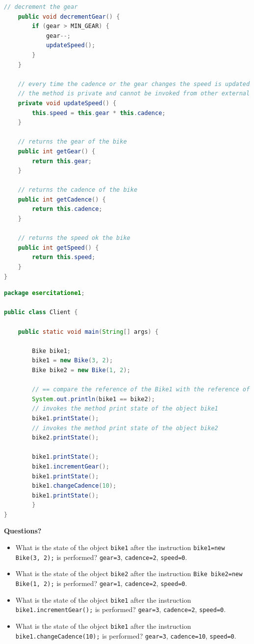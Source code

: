 \documentclass{article}
\theoremstyle{definition}
\begin{document}
\begin{lstlisting}[language=Java,escapechar=|]
	// decrement the gear
	public void decrementGear() {
		if (gear > MIN_GEAR) {
			gear--;
			updateSpeed();
		}
	}

	// every time the cadence or the gear changes the speed is updated
	// the method is private and cannot be invoked from other external classes
	private void updateSpeed() {
		this.speed = this.gear * this.cadence;
	}

	// returns the gear of the bike
	public int getGear() {
		return this.gear;
	}

	// returns the cadence of the bike
	public int getCadence() {
		return this.cadence;
	}

	// returns the speed ok the bike
	public int getSpeed() {
		return this.speed;
	}
}
\end{lstlisting}

\begin{lstlisting}[language=Java,escapechar=|]
package esercitatione1;

public class Client {

	public static void main(String[] args) {

		Bike bike1;
		bike1 = new Bike(3, 2);
		Bike bike2 = new Bike(1, 2);

		// == compare the reference of the Bike1 with the reference of the Bike2
		System.out.println(bike1 == bike2);
		// invokes the method print state of the object bike1
		bike1.printState();
		// invokes the method print state of the object bike2
		bike2.printState();

		bike1.printState();
		bike1.incrementGear();
		bike1.printState();
		bike1.changeCadence(10);
		bike1.printState();
	    }
}
\end{lstlisting}
\textbf{Questions?}\\
\begin{itemize}
\item What is  the state of the object \texttt{bike1} after the instruction  \texttt{bike1=new Bike(3, 2);} is performed? 
\texttt{gear=3}, \texttt{cadence=2}, \texttt{speed=0}.
\item What is  the state of the object \texttt{bike2} after the instruction  \texttt{Bike bike2=new Bike(1, 2);} is performed? 
\texttt{gear=1}, \texttt{cadence=2}, \texttt{speed=0}.
\item What is  the state of the object \texttt{bike1} after the instruction  \texttt{bike1.incrementGear();} is performed? 
\texttt{gear=3}, \texttt{cadence=2}, \texttt{speed=0}.
\item What is  the state of the object \texttt{bike1} after the instruction  \texttt{bike1.changeCadence(10);} is performed? 
\texttt{gear=3}, \texttt{cadence=10}, \texttt{speed=0}.
\end{itemize}
\end{document}
